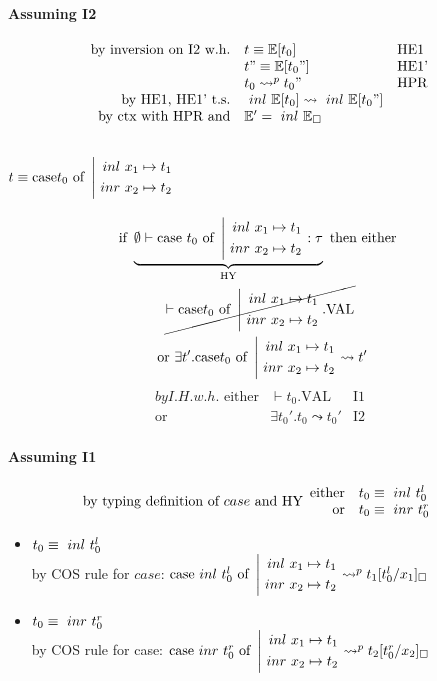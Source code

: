 \documentclass{article}
\begin{document}
\paragraph{Assuming I2}
\[
    \begin{array}{rl @{\quad} l}
        \text{by inversion on I2 w.h.}   &  t \equiv \mE[t_0]         & \text{HE1}\\
                                         &  t" \equiv \mE[t_0"]        & \text{HE1'}\\
                                         &  t_0 \leadsto^p t_0"     & \text{HPR}\\
        \text{by HE1, HE1' t.s.}         &  \inl \mE[t_0] \leadsto \inl \mE[t_0"] \\
        \text{by ctx with HPR and}       &  \mE' = \inl \mE _\square \\
    \end{array}
\]

\subsection{$t \equiv \text{case}t_0\ \text{of}\ \left|\begin{aligned}\ inl\  x_1 \mapsto t_1\\\ inr\  x_2 \mapsto t_2\end{aligned}\right.$}
\begin{multline*}
    \text{if } \underbrace{\emptyset \vdash \text{case}\ t_0\ \text{of}\ \left|\begin{aligned}\ inl\  x_1 \mapsto t_1\\\ inr\  x_2 \mapsto t_2\end{aligned}\right.:\tau}_\text{HY} \text{ then either } \\ \cancel{ \vdash \text{case}t_0\ \text{of}\ \left|\begin{aligned}\ inl\  x_1 \mapsto t_1\\\ inr\  x_2 \mapsto t_2\end{aligned}\right..\text{VAL} } \\ \text{ or } \exists t'.\text{case}t_0\ \text{of}\ \left|\begin{aligned}\ inl\  x_1 \mapsto t_1\\\ inr\  x_2 \mapsto t_2\end{aligned}\right.\leadsto t'
\end{multline*} 
\begin{align*}
    by I.H. w.h. \text{ either} & \vdash t_0.\text{VAL} & \text{I1}\\
    \text{or}                   & \exists t_0'.t_0\leadsto t_0' & \text{I2}
\end{align*}

\paragraph{Assuming I1}
\begin{equation*}
    \text{by typing definition of $case$ and HY}\begin{array}{r@{\quad}l} 
        \text{either} & t_0 \equiv \inl t_0^l \\
        \text{or}     & t_0 \equiv \inr t_0^r
    \end{array}
\end{equation*}
\begin{itemize}
    \item $t_0\equiv\ inl\  t_0^l$ \\
            by COS rule for $case$: $\text{case}\ inl\  t_0^l\ \text{of}\ \left|\begin{aligned}\ inl\  x_1 \mapsto t_1\\\ inr\  x_2 \mapsto t_2\end{aligned}\right. \leadsto^p t_1[t_0^l/x_1]_\square$ \\

    \item $t_0\equiv\ inr\  t_0^r$ \\
        by COS rule for case: $\text{case}\ inr\  t_0^r\ \text{of}\ \left|\begin{aligned}\ inl\  x_1 \mapsto t_1\\\ inr\  x_2 \mapsto t_2\end{aligned}\right. \leadsto^p t_2[t_0^r/x_2]_\square$
\end{itemize}
\end{document}
